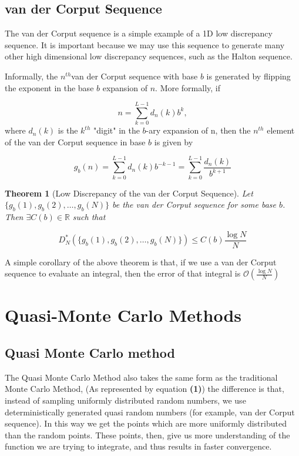 \documentclass[12pt,letterpaper, twoside]{article}
\newtheorem{theorem}{Theorem}
\theoremstyle{definition}
\begin{document}
\subsection{van der Corput Sequence}

The van der Corput sequence \cite{kokshmaWikipedia}\cite{VanDerWiki} is a simple example of a 1D low discrepancy sequence. It is important because we may use this sequence to generate many other high dimensional low discrepancy sequences, such as the Halton sequence. 

Informally, the $n^{th}$van der Corput sequence with base $b$ is generated by flipping the exponent in the base $b$ expansion of $n$. More formally, if 

$$
n = \sum_{k=0}^{L-1}d_n(k) b^k,
$$ where $d_n(k)$ is the $k^{th}$ "digit" in the $b$-ary expansion of n, then the $n^{th}$ element of the van der Corput sequence in base $b$ is given by 

$$
g_b(n) = \sum_{k=0}^{L-1}d_n(k)b^{-k-1} = \sum_{k=0}^{L-1}\frac{d_n(k)}{b^{k+1}}
$$

\begin{theorem}[Low Discrepancy of the van der Corput Sequence]
Let $\{g_b(1),g_b(2), \ldots , g_b(N)\}$ be the van der Corput sequence for some base $b$. Then $\exists C(b) \in \mathbb{R}$ such that

$$
D_N^*(\{g_b(1),g_b(2), \ldots , g_b(N)\}) \leq C(b) \frac{\log N}{N}
$$
\end{theorem}
A simple corollary of the above theorem is that, if we use a van der Corput sequence to evaluate an integral, then the error of that integral is $\mathcal{O}(\frac{\log N}{N})$

\section{Quasi-Monte Carlo Methods}

\subsection{Quasi Monte Carlo method}
The Quasi Monte Carlo Method \cite{owenReport}\cite{kuoReport}\cite{qmcWikipedia} also takes the same form as the traditional Monte Carlo Method, (As represented by equation \textbf{(1)}) the difference is that, instead of sampling uniformly distributed random numbers, we use deterministically generated quasi random numbers (for example, van der Corput sequence). In this way we get the points which are more uniformly distributed than the random points. These points, then, give us more understanding of the function we are trying to integrate, and thus results in faster convergence.
\end{document}
